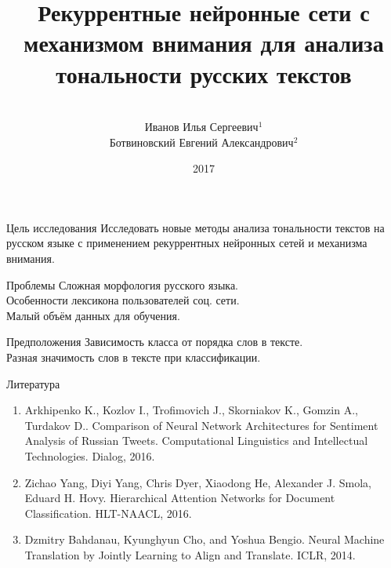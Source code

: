 \documentclass{beamer}
\title[\hbox to 56mm{\hfill\insertframenumber\,/\,\inserttotalframenumber}]
{Рекуррентные нейронные сети с механизмом внимания для анализа тональности русских текстов}
\author[И.\,С. Иванов]{\large \\Иванов Илья Сергеевич$^{1}$
{\large \\Ботвиновский Евгений Александрович$^{2}$}}
\institute{
$^{1}$студент, Московский Физико-Технический Институт\\
$^{2}$к.ф.-м.н., DeepHackLab\\
}
\date{2017}
\begin{document}
\nocite{*}
\begin{frame}
\titlepage
\end{frame}
\begin{frame}{Цель исследования}
Исследовать новые методы анализа тональности текстов на русском языке с применением рекуррентных нейронных сетей и механизма внимания.
\begin{block}{Проблемы}
	Сложная морфология русского языка.\\
	Особенности лексикона пользователей соц. сети.\\
	Малый объём данных для обучения.\\
\end{block}

\begin{block}{Предположения}
	Зависимость класса от порядка слов в тексте.\\
	Разная значимость слов в тексте при классификации.
\end{block}

\end{frame}
\begin{frame}{Литература}
	\begin{enumerate}
		\item Arkhipenko K., Kozlov I., Trofimovich J., Skorniakov K., Gomzin A., Turdakov D.. Comparison of Neural Network Architectures for Sentiment Analysis of Russian Tweets. Computational Linguistics and Intellectual Technologies. Dialog, 2016.	
		\item Zichao Yang, Diyi Yang, Chris Dyer, Xiaodong He, Alexander J. Smola, Eduard H. Hovy. Hierarchical Attention Networks for Document Classification. HLT-NAACL, 2016.
		\item Dzmitry Bahdanau, Kyunghyun Cho, and Yoshua Bengio. Neural Machine Translation by Jointly Learning to Align and Translate. ICLR, 2014.
	\end{enumerate}
\end{frame}
\end{document}
